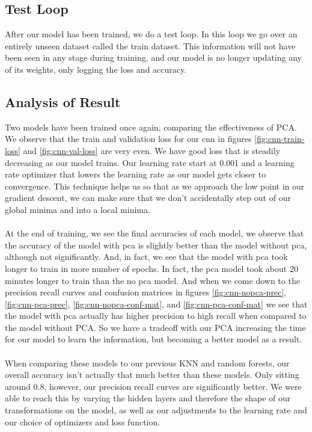 \documentclass[12pt,a4paper]{article}
\begin{document}
    \subsection{Test Loop}
    After our model has been trained, we do a test loop. In this loop we go over an entirely unseen dataset called
    the train dataset. This information will not have been seen in any stage during training, and our model is no longer
    updating any of its weights, only logging the loss and accuracy.

    \subsection{Analysis of Result}
    Two models have been trained once again, comparing the effectiveness of PCA. 
    We observe that the train and validation loss for our cnn in figures \ref{fig:cnn-train-loss} and \ref{fig:cnn-val-loss}
    are very even. We have good loss that is steadily decreasing as our model trains. Our learning rate start at 0.001
    and a learning rate optimizer that lowers the learning rate as our model gets closer to convergence. This technique
    helps us so that as we approach the low point in our gradient descent, we can make sure that we don't accidentally
    step out of our global minima and into a local minima.
    \\
    \\
    At the end of training, we see the final accuracies of each model, we observe that the accuracy of the model with pca
    is slightly better than the model without pca, although not significantly. And, in fact, we see that the model with pca 
    took longer to train in more number of epochs. In fact, the pca model took about 20 minutes longer to train than the no pca model.
    And when we come down to the precision recall curves and confusion matrices in figures \ref{fig:cnn-nopca-prec}, \ref{fig:cnn-pca-prec},
    \ref{fig:cnn-nopca-conf-mat}, and \ref{fig:cnn-pca-conf-mat} we see that the model with pca actually has higher precision to high recall
    when compared to the model without PCA. So we have a tradeoff with our PCA increasing the time for our model to learn the information,
    but becoming a better model as a result.
    \\
    \\
    When comparing these models to our previous KNN and random forests, our overall accuracy isn't actually that much better than these models.
    Only sitting around 0.8, however, our precision recall curves are significantly better. We were able to reach this by varying the hidden layers
    and therefore the shape of our transformations on the model, as well as our adjustments to the learning rate and our choice of optimizers and loss function.
\end{document}
